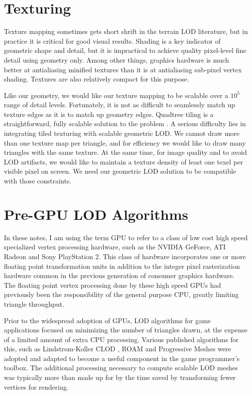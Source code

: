 \documentclass[12pt]{article}
\begin{document}
\section{Texturing}

Texture mapping sometimes gets short shrift in the terrain LOD
literature, but in practice it is critical for good visual results.
Shading is a key indicator of geometric shape and detail, but it is
impractical to achieve quality pixel-level fine detail using geometry
only.  Among other things, graphics hardware is much better at
antialiasing minified textures than it is at antialiasing sub-pixel
vertex shading.  Textures are also relatively compact for this
purpose.
 
Like our geometry, we would like our texture mapping to be scalable
over a $10^5$ range of detail levels.  Fortunately, it is not as
difficult to seamlessly match up texture edges as it is to match up
geometry edges.  Quadtree tiling is a straightforward, fully scalable
solution to the problem \cite{ulrich01}.  A serious difficulty lies in
integrating tiled texturing with scalable geometric LOD.  We cannot
draw more than one texture map per triangle, and for efficiency we
would like to draw many triangles with the same texture.  At the same
time, for image quality and to avoid LOD artifacts, we would like to
maintain a texture density of least one texel per visible pixel on
screen.  We need our geometric LOD solution to be compatible with
those constraints.
 
\section{Pre-GPU LOD Algorithms}

In these notes, I am using the term GPU to refer to a class of low
cost high speed specialized vertex processing hardware, such as the
NVIDIA GeForce, ATI Radeon and Sony PlayStation 2.  This class of
hardware incorporates one or more floating point transformation units
in addition to the integer pixel rasterization hardware common in the
previous generation of consumer graphics hardware.  The floating point
vertex processing done by these high speed GPUs had previously been
the responsibility of the general purpose CPU, greatly limiting
triangle throughput.
 
Prior to the widespread adoption of GPUs, LOD algorithms for game
applications focused on minimizing the number of triangles drawn, at
the expense of a limited amount of extra CPU processing.  Various
published algorithms for this, such as Lindstrom-Koller CLOD
\cite{lindstrom96}, ROAM \cite{duchaineau} and Progressive Meshes
\cite{hoppe96} were adopted and adapted to become a useful component
in the game programmer's toolbox.  The additional processing necessary
to compute scalable LOD meshes was typically more than made up for by
the time saved by transforming fewer vertices for rendering.
\end{document}
